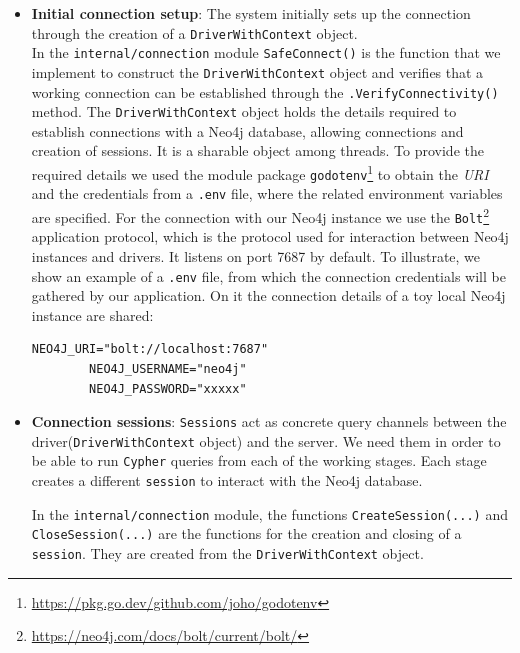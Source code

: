 \begin{itemize}
    \item \textbf{Initial connection setup}: The \DPATM system initially sets up the connection through the creation of a \texttt{DriverWithContext} object.\\
    In the \texttt{internal/connection} module \texttt{SafeConnect()} is the function that we implement to construct the \texttt{DriverWithContext} object and verifies that a working connection can be established through the \texttt{.VerifyConnectivity()} method.
    The \texttt{DriverWithContext} object holds the details required to establish connections with a Neo4j database, allowing connections and creation of sessions. It is a sharable object among threads. To provide the required details we used the module package \texttt{godotenv}\footnote{\url{https://pkg.go.dev/github.com/joho/godotenv}} to obtain the \textit{URI} and the credentials from a \texttt{.env} file, where the related environment variables are specified. For the connection with our Neo4j instance we use the \texttt{Bolt}\footnote{\url{https://neo4j.com/docs/bolt/current/bolt/}} application protocol, which is the protocol used for interaction between Neo4j instances and drivers. It listens on port 7687 by default. 
    To illustrate, we show an example of a \texttt{.env} file, from which the connection credentials will be gathered by our application. On it the connection details of a toy local Neo4j instance are shared:

    \begin{center}
    \lstset{style=cypherStyle}
    \begin{lstlisting}[caption={Example of a \texttt{.env} file, from which from which the connection credentials will be gathered by our \DPATM application.}]
        NEO4J_URI="bolt://localhost:7687"
        NEO4J_USERNAME="neo4j"
        NEO4J_PASSWORD="xxxxx"
    \end{lstlisting}
    \end{center}

    \item \textbf{Connection sessions}: \texttt{Sessions} act as concrete query channels between the driver(\texttt{DriverWithContext} object) and the server. We need them in order to be able to run \texttt{Cypher} queries from each of the working \filter stages. Each \filter stage creates a different \texttt{session} to interact with the Neo4j database.
    
    In the \texttt{internal/connection} module, the functions \texttt{CreateSession(...)} and \texttt{CloseSession(...)} are the functions for the creation and closing of a \texttt{session}.
    They are created from the \texttt{DriverWithContext} object. 


\end{itemize}
